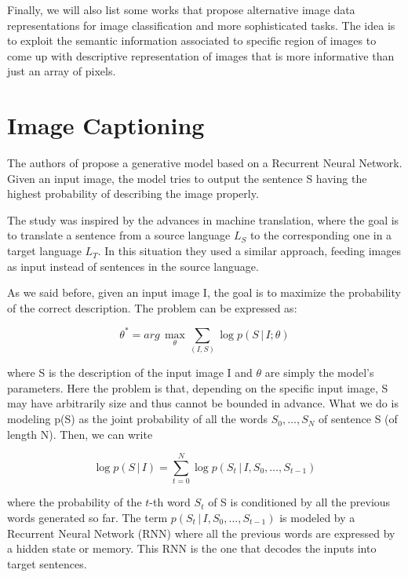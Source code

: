 \documentclass[12pt, twoside, a4paper]{report}
\begin{document}
\bigskip

Finally, we will also list some works that propose alternative image data representations for image classification and more sophisticated tasks. The idea is to exploit the semantic information associated to specific region of images to come up with descriptive representation of images that is more informative than just an array of pixels.

\section{Image Captioning}

The authors of \cite{show-and-tell} propose a generative model based on a Recurrent Neural Network. Given an input image, the model tries to output the sentence S having the highest probability of describing the image properly. 

The study was inspired by the advances in machine translation, where the goal is to translate a sentence from a source language $L_S$ to the corresponding one in a target language $L_T$. 
In this situation they used a similar approach, feeding images as input instead of sentences in the source language.

As we said before, given an input image I, the goal is to maximize the probability of the correct description. The problem can be expressed as:

\begin{equation}
\theta^* = arg\,\max\limits_{\theta} \sum\limits_{(I, S)} \log p(S \, | \, I; \theta) 
\end{equation}

where S is the description of the input image I and $\theta$ are simply the model's parameters. Here the problem is that, depending on the specific input image, S may have arbitrarily size and thus cannot be bounded in advance. What we do is modeling p(S) as the joint probability of all the words $S_0, \dots, S_N$ of sentence S (of length N). Then, we can write 

\begin{equation}
\log p(S \, | \, I)  = \sum\limits_{t=0}^N \log p(S_t \, | \, I, S_0, \dots, S_{t-1}) 
\end{equation}

where the probability of the $t$-th word $S_t$ of S is conditioned by all the previous words generated so far. The term $p(S_t \, | \, I, S_0, \dots, S_{t-1})$ is modeled by a Recurrent Neural Network (RNN) where all the previous words are expressed by a hidden state or memory. This RNN is the one that decodes the inputs into target sentences.
\end{document}
